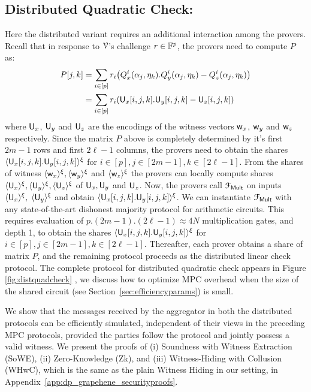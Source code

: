 \subsection{Distributed Quadratic Check:} Here the distributed variant requires an additional interaction among the provers. Recall that in response to $\mathcal{V}$'s challenge $r\in \mathbb{F}^p$, the provers need to compute $P$ as:
\begin{align*}
	P[j,k] & =\sum_{i\in [p]} r_i\big(Q_x^i(\alpha_j,\eta_k).Q_y^i(\alpha_j,\eta_k)-Q_z^i(\alpha_j,\eta_k)\big)\\ 
	& = \sum_{i\in [p]}r_i(\mathsf{U}_x[i,j,k].\mathsf{U}_y[i,j,k] - \mathsf{U}_z[i,j,k])
\end{align*}    
where $\mathsf{U}_x$, $\mathsf{U}_y$ and $\mathsf{U}_z$ are the encodings of the witness
vectors $\mathsf{w}_x$, $\mathsf{w}_y$ and $\mathsf{w}_z$ respectively. 
Since the matrix $P$ above is completely determined by it's first $2m-1$ rows
and first $2\ell-1$ columns, the provers need to obtain the shares
$\langle{\mathsf{U}_x[i,j,k].\mathsf{U}_y[i,j,k]}\rangle^\xi$ for $i\in [p],j\in [2m-1],k\in [2\ell-1]$.
From the shares of witness $\langle{\mathsf{w}_x}\rangle^\xi,\langle{\mathsf{w}_y}\rangle^\xi$ and $\langle{\mathsf{w}_z}\rangle^\xi$ the
provers can locally compute shares $\langle{\mathsf{U}_x}\rangle^\xi,\langle{\mathsf{U}_y}\rangle^\xi,\langle{\mathsf{U}_z}\rangle^\xi$
of $\mathsf{U}_x,\mathsf{U}_y$ and $\mathsf{U}_z$. Now, the provers call $\mathcal{F}_{\sf Mult}$ on inputs $\langle{\mathsf{U}_x}\rangle^\xi,\; \langle{\mathsf{U}_y}\rangle^\xi$ and obtain $\langle{\mathsf{U}_x[i,j,k].\mathsf{U}_y[i,j,k]}\rangle^\xi$.
We can instantiate $\mathcal{F}_{\sf Mult}$ with any state-of-the-art dishonest majority protocol for arithmetic circuits.
This requires evaluation of $p.(2m-1).(2\ell-1)\approx 4N$ multiplication gates, and depth 1, to obtain the
shares $\langle{\mathsf{U}_x[i,j,k].\mathsf{U}_y[i,j,k]}\rangle^\xi$ for $i\in [p],j\in [2m-1],k\in [2\ell-1]$.
Thereafter, each prover obtains a share of matrix $P$, and the remaining protocol proceeds as
the distributed linear check protocol. 
The complete protocol for
distributed quadratic check appears in Figure \ref{fig:distquadcheck} %
, we discuss how to optimize MPC overhead when the size of the shared circuit (see Section~\ref{sec:efficiencyparams}) is small.

We show that the messages received by the aggregator in both the distributed protocols can be efficiently simulated, independent of
their views in the preceding MPC protocols, provided the parties follow the
protocol and jointly possess a valid witness. We present the proofs of (i) Soundness with Witness Extraction (SoWE), (ii) Zero-Knowledge (Zk), and (iii) Witness-Hiding with Collusion (WHwC), which is the same as the plain Witness Hiding in our setting, in Appendix~\ref{app:dp_grapehene_securityproofs}. 
